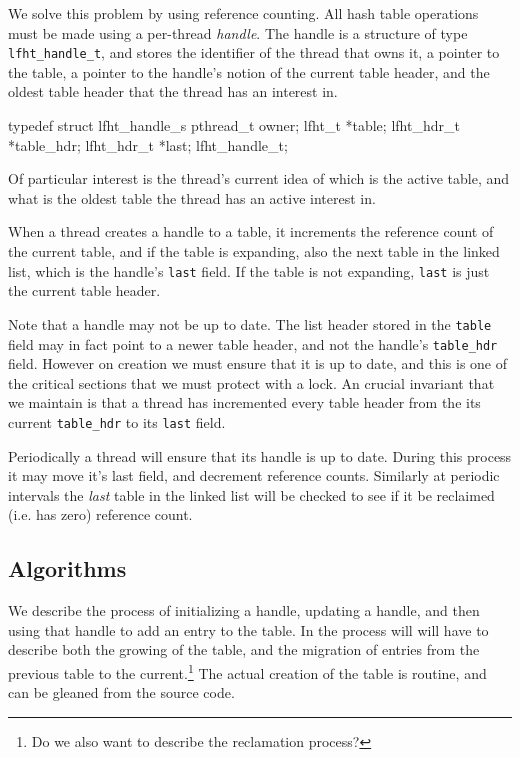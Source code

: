 We solve this problem by using reference counting.
All hash table operations must be made using a per-thread {\em handle\/}. The handle is  a
structure of type \texttt{lfht\_handle\_t}, and stores
the identifier of the thread that owns it, a pointer to the table, a pointer to the handle's notion
of the current table header, and the oldest table header that the thread has an interest in.

\begin{center}
\begin{clisting}
typedef struct lfht_handle_s {
  pthread_t owner;
  lfht_t *table;
  lfht_hdr_t *table_hdr;
  lfht_hdr_t *last;  
} lfht_handle_t;
\end{clisting}
\end{center}

Of particular interest is the thread's current idea of which
is the active table, and what is the oldest table the thread has
an active interest in.


When a thread creates a handle to a table, it increments the reference
count of the current table, and if the table is expanding, also the
next table in the linked list, which is the handle's \texttt{last} field.  If
the table is not expanding, \texttt{last} is just the current table header.

Note that a handle may not be up to date. The list
header stored in the \texttt{table} field may in fact point to a newer table header,
and not the handle's \texttt{table\_hdr}
field. However on creation we must ensure that it is up to date, and
this is one of the critical sections that we must protect with a lock.
An crucial invariant that we maintain is that a thread has incremented
every table header from the its current \texttt{table\_hdr} to its \texttt{last}
field.

Periodically a thread will ensure that its handle is up to date. During this process
it may move it's last field, and decrement reference counts. Similarly
at periodic intervals the {\em last} table in the linked list will be checked to see
if it be reclaimed (i.e. has zero) reference count.


\subsection{Algorithms}


We describe the process of initializing a handle, updating a handle, and then using that handle
to add an entry to the table. In the process will will have to describe both the growing of the table,
and the migration of entries from the previous table to the
current.\footnote{Do we also want to describe the reclamation process?}
The actual creation of the table is routine,
and can be gleaned from the source code\cite{lfht2017}.


